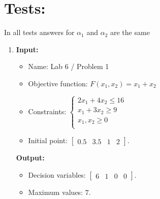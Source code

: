 \documentclass{article}
\begin{document}
\newpage

\section*{Tests:}

In all tests answers for \(\alpha_1\) and \(\alpha_2\) are the same

\begin{enumerate}[label={(\arabic*)}, itemsep=0.25in]
    \item \textbf{Input:}
          \begin{itemize}
              \item Name: Lab 6 / Problem 1
              \item Objective function: \(F(x_1, x_2) = x_1 + x_2\)
              \item Constraints: \(\begin{cases}
                        2 x_1 + 4 x_2 \le 16 \\
                        x_1 + 3 x_2 \ge 9    \\
                        x_1 , x_2 \ge 0      \\
                    \end{cases}\)
          \end{itemize}
          \begin{itemize}
              \item Initial point: \(\begin{bmatrix} 0.5 & 3.5 & 1 & 2 \end{bmatrix}\).
          \end{itemize}
          \textbf{Output:}
          \begin{itemize}
              \item Decision variables: \(\begin{bmatrix} 6 & 1 & 0 & 0 \end{bmatrix}\).
              \item Maximum values: \(7\).
          \end{itemize}


\end{enumerate}
\end{document}
